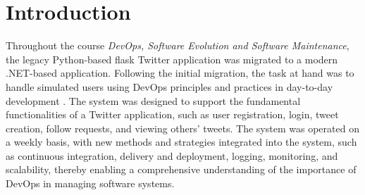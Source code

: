 \chapter{Introduction}

Throughout the course \textit{DevOps, Software Evolution and Software Maintenance}, the legacy Python-based flask Twitter application was migrated to a modern .NET-based application. Following the initial migration, the task at hand was to handle simulated users using DevOps principles and practices in day-to-day development \cite{kim2016devops}. The system was designed to support the fundamental functionalities of a Twitter application, such as user registration, login, tweet creation, follow requests, and viewing others' tweets. The system was operated on a weekly basis, with new methods and strategies integrated into the system, such as continuous integration, delivery and deployment, logging, monitoring, and scalability, thereby enabling a comprehensive understanding of the importance of DevOps in managing software systems.